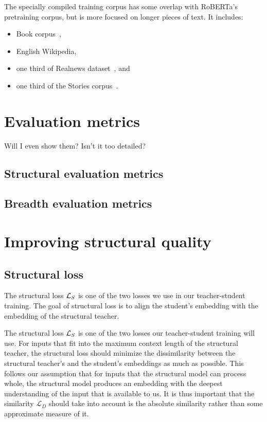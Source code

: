 The specially compiled training corpus has some overlap with RoBERTa's
pretraining corpus, but is more focused on longer pieces of text. It includes:

\begin{itemize}
  \item Book corpus~\cite{zhu2015aligning},
  \item English Wikipedia,
  \item one third of Realnews dataset~\cite{zellers2019defending}, and
  \item one third of the Stories corpus~\cite{trinh2018simple}.
\end{itemize}

\section{Evaluation metrics}

Will I even show them? Isn't it too detailed?

\subsection{Structural evaluation metrics}
\subsection{Breadth evaluation metrics}

\section{Improving structural quality}

\subsection{Structural loss}\label{section:structural_loss}


The structural loss $\mathcal{L}_S$ is one of the two losses we use in our
teacher-student training. The goal of structural loss is to align the student's
embedding with the embedding of the structural teacher.

The structural loss $\mathcal{L}_S$ is one of the two losses our teacher-student
training will use. For inputs that fit into the maximum context length of the
structural teacher, the structural loss should minimize the dissimilarity
between the structural teacher's and the student's embeddings as much as
possible. This follows our assumption that for inputs that the structural model
can process whole, the structural model produces an embedding with the deepest
understanding of the input that is available to us. It is thus important that
the similarity $\mathcal{L}_D$ should take into account is the absolute
similarity rather than some approximate measure of it.

